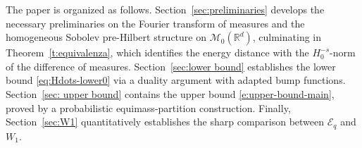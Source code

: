 \documentclass[12pt,a4paper,oneside]{amsart}
\theoremstyle{plain}
\theoremstyle{definition}
\numberwithin{equation}{section}
\numberwithin{figure}{section}
\numberwithin{table}{section}
\theoremstyle{remark}
\newcommand{\R}{\mathbb{R}}
\begin{document}
\medskip
The paper is organized as follows. Section~\ref{sec:preliminaries} develops 
the necessary preliminaries on the Fourier transform of measures and the 
homogeneous Sobolev pre-Hilbert structure on $\mathcal{M}_0(\R^d)$, 
culminating in Theorem~\ref{t:equivalenza}, which identifies the energy 
distance with the ${H}^{-s}_0$-norm of the difference of measures. 
Section~\ref{sec:lower bound} establishes the lower bound 
\eqref{eq:Hdots-lower0} via a duality argument with adapted bump functions. 
Section~\ref{sec: upper bound} contains the upper bound 
\eqref{e:upper-bound-main}, proved by a probabilistic equimass-partition 
construction. Finally, Section~\ref{sec:W1} quantitatively establishes the sharp comparison between $\mathcal{E}_q$ and $W_1$.







 
 
\end{document}
